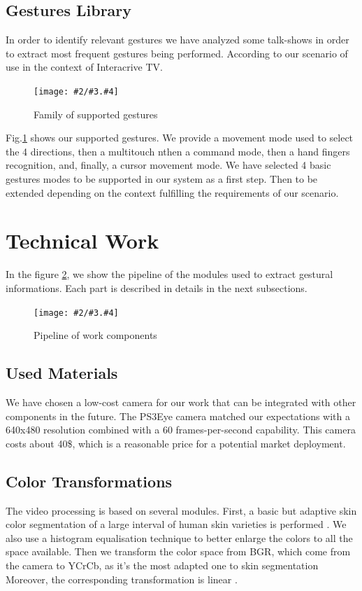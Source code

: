 \documentclass{llncs}
\newcommand{\imagepathext}[5]{%
\begin{figure}[!htbp]
\hfil\texttt{[image: \#2/\#3.\#4]}\hfil
\caption{#5\label{#3}}
\end{figure}}
\newcommand{\png}[2]{\imagepathext{width=\columnwidth}{pics}{#1}{png}{#2}}
\begin{document}
\subsection{Gestures Library}

In order to identify relevant gestures we have analyzed some talk-shows in order
to extract most frequent gestures being performed.
According to our scenario of use in the context of Interacrive TV.

\png{handg}{Family of supported gestures}

Fig.\ref{handg} shows our supported gestures. We provide a movement mode
used to select the 4 directions, then a multitouch nthen a command mode, then a hand fingers recognition,
and, finally, a cursor movement mode.
We have selected 4 basic gestures modes to be supported in our system as a first step.
Then to be extended depending on the context fulfilling the requirements
of our scenario.

\section{Technical Work}

In the figure \ref{pipeline}, we show the pipeline of the modules used to
extract gestural informations. Each part is described in details in the next
subsections.

\png{pipeline}{Pipeline of work components}


\subsection{Used Materials}
We have chosen a low-cost camera for our work that can be integrated with other components in the future.
The PS3Eye camera matched our expectations with a 640x480 resolution combined with a 60 frames-per-second capability.
This camera costs about 40\$, which is a reasonable price for a potential market deployment.

\subsection{Color Transformations}
The video processing is based on several modules.
First, a basic but adaptive skin color segmentation of a large interval of human skin varieties is performed \cite{skinColorSeg}.
We also use a histogram equalisation technique to better enlarge the colors to all the space available.
Then we transform the color space from BGR, which come from the camera to YCrCb,
as it’s the most adapted one to skin segmentation
Moreover, the corresponding transformation is linear \cite{skinColorSeg}.
\end{document}
